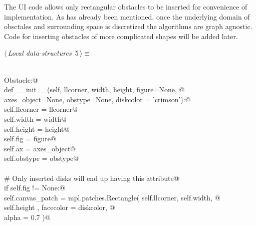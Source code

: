 \documentclass[11.5pt]{report}
\begin{document}
\begin{flushleft}
\begin{list}{}{\setlength{\itemsep}{-\parsep}\setlength{\itemindent}{-\leftmargin}}
\item{}
\end{list}
\vspace{4ex}
\end{flushleft}

The UI code allows only rectangular obstacles to be inserted for convenience of implementation. As has already been mentioned, once the underlying domain of obsctales and surrounding
space is discretized the algorithms are graph agnostic. Code for inserting obstacles of more complicated shapes will be added later. 

\begin{flushleft} \small\label{scrap3}\raggedright\small
{} $\langle\,${\itshape Local data-structures}\nobreak\ {\footnotesize {5}}$\,\rangle\equiv$
\vspace{-1ex}
\begin{list}{}{} \item
\mbox{}\verb@@\\
\mbox{}\verb@class Obstacle:@\\
\mbox{}\verb@    def __init__(self, llcorner, width, height, figure=None, @\\
\mbox{}\verb@                 axes_object=None, obstype=None, diskcolor = 'crimson'):@\\
\mbox{}\verb@        self.llcorner = llcorner@\\
\mbox{}\verb@        self.width    = width@\\
\mbox{}\verb@        self.height   = height@\\
\mbox{}\verb@        self.fig      = figure@\\
\mbox{}\verb@        self.ax       = axes_object@\\
\mbox{}\verb@        self.obstype  = obstype@\\
\mbox{}\verb@@\\
\mbox{}\verb@        # Only inserted disks will end up having this attribute@\\
\mbox{}\verb@        if self.fig != None:@\\
\mbox{}\verb@             self.canvas_patch =  mpl.patches.Rectangle( self.llcorner, self.width, @\\
\mbox{}\verb@                                                         self.height  , facecolor = diskcolor, @\\
\mbox{}\verb@                                                         alpha = 0.7 )@\\
\mbox{}\verb@@\\

\end{list}
\end{flushleft}
\end{document}
